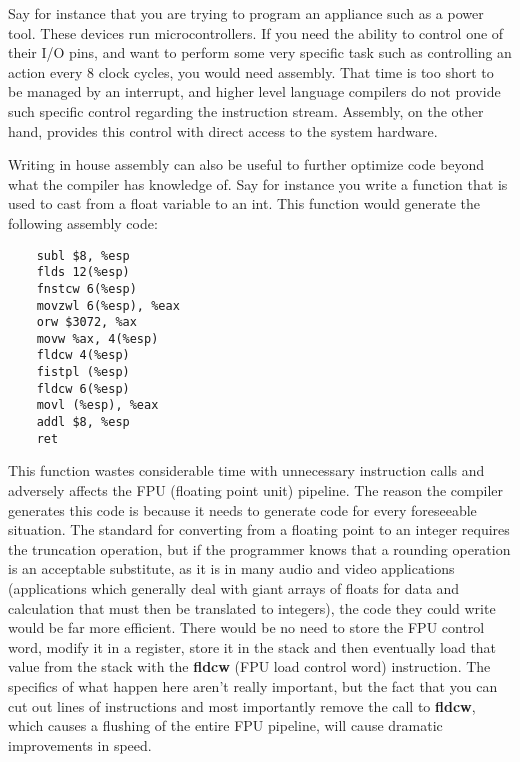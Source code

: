 \documentclass[11pt]{article}
\begin{document}
Say for instance that you are trying to program an appliance such as a power tool. These devices run microcontrollers. If you need the ability to control one of their I/O pins, and want to perform some very specific task such as controlling an action every 8 clock cycles, you would need assembly. That time is too short to be managed by an interrupt, and higher level language compilers do not provide such specific control regarding the instruction stream. Assembly, on the other hand, provides this control with direct access to the system hardware. 


Writing in house assembly can also be useful to further optimize code beyond what the compiler has knowledge of. Say for instance you write a function that is used to cast from a float variable to an int. This function would generate the following assembly code:

\begin{verbatim}
    subl $8, %esp
    flds 12(%esp)
    fnstcw 6(%esp)
    movzwl 6(%esp), %eax
    orw $3072, %ax
    movw %ax, 4(%esp)
    fldcw 4(%esp)
    fistpl (%esp)
    fldcw 6(%esp)
    movl (%esp), %eax
    addl $8, %esp
    ret
\end{verbatim}

This function wastes considerable time with unnecessary instruction calls and adversely affects the FPU (floating point unit) pipeline. The reason the compiler generates this code is because it needs to generate code for every foreseeable situation. The standard for converting from a floating point to an integer requires the truncation operation, but if the programmer knows that a rounding operation is an acceptable substitute, as it is in many audio and video applications (applications which generally deal with giant arrays of floats for data and calculation that must then be translated to integers), the code they could write would be far more efficient. There would be no need to store the FPU control word, modify it in a register, store it in the stack and then eventually load that value from the stack with the \textbf{fldcw} (FPU load control word) instruction. The specifics of what happen here aren’t really important, but the fact that you can cut out lines of instructions and most importantly remove the call to \textbf{fldcw}, which causes a flushing of the entire FPU pipeline, will cause dramatic improvements in speed.
\end{document}
